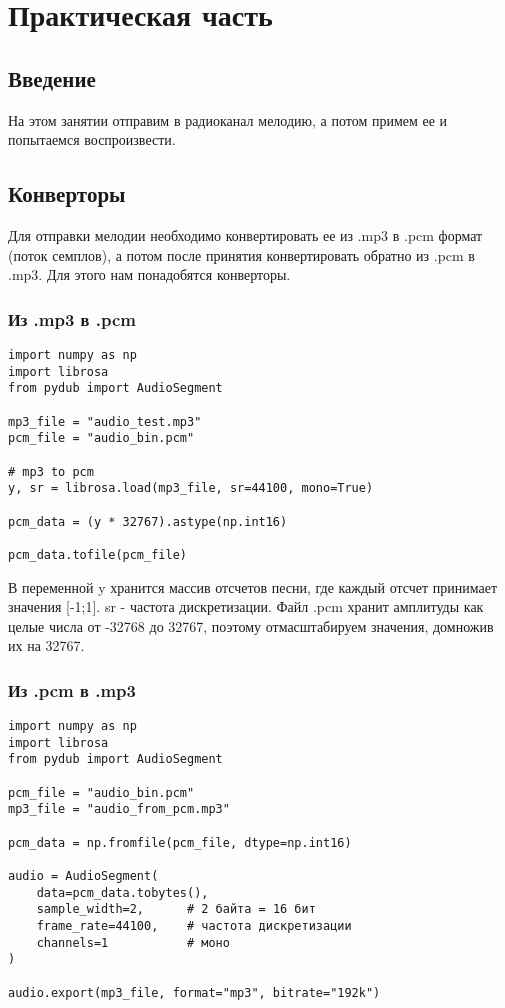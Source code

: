 \chapter{Практическая часть}
\label{ch:chap2}

\section*{\textbf{Введение}}
На этом занятии отправим в радиоканал мелодию, а потом примем ее и попытаемся воспроизвести.

\section*{\textbf{Конверторы}}

Для отправки мелодии необходимо конвертировать ее из .mp3 в .pcm формат (поток семплов), а потом после принятия конвертировать 
обратно из .pcm в .mp3. Для этого нам понадобятся конверторы. 

\subsection*{\textbf{Из .mp3 в .pcm}}

\begin{lstlisting}
import numpy as np
import librosa
from pydub import AudioSegment

mp3_file = "audio_test.mp3"
pcm_file = "audio_bin.pcm"

# mp3 to pcm
y, sr = librosa.load(mp3_file, sr=44100, mono=True)

pcm_data = (y * 32767).astype(np.int16)

pcm_data.tofile(pcm_file)
\end{lstlisting}

В переменной y хранится массив отсчетов песни, где каждый отсчет принимает значения [-1;1]. sr - частота дискретизации. 
Файл .pcm хранит амплитуды как целые числа от -32768 до 32767, поэтому отмасштабируем значения, домножив их на 32767.

\subsection*{\textbf{Из .pcm в .mp3}}

\begin{lstlisting}
import numpy as np
import librosa
from pydub import AudioSegment

pcm_file = "audio_bin.pcm"
mp3_file = "audio_from_pcm.mp3"

pcm_data = np.fromfile(pcm_file, dtype=np.int16)

audio = AudioSegment(
    data=pcm_data.tobytes(),
    sample_width=2,      # 2 байта = 16 бит
    frame_rate=44100,    # частота дискретизации
    channels=1           # моно
)

audio.export(mp3_file, format="mp3", bitrate="192k")
\end{lstlisting}

